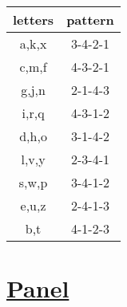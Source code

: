 \documentclass[letterpaper,12pt]{report}
\begin{document}
\begin{center}
  \begin{tabular}{|c|c|}
    \hline
    letters & pattern \\
    \hline
    a,k,x   & 3-4-2-1 \\
    \hline
    c,m,f   & 4-3-2-1 \\
    \hline
    g,j,n   & 2-1-4-3 \\
    \hline
    i,r,q   & 4-3-1-2 \\
    \hline
    d,h,o   & 3-1-4-2 \\
    \hline
    l,v,y   & 2-3-4-1 \\
    \hline
    s,w,p   & 3-4-1-2 \\
    \hline
    e,u,z   & 2-4-1-3 \\
    \hline
    b,t     & 4-1-2-3 \\
    \hline
  \end{tabular}
\end{center}
\pagebreak

\section*{\underline{Panel}}
\end{document}
